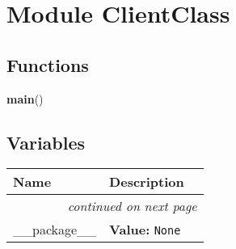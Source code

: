 %
%
%


\section{Module ClientClass}

    \label{ClientClass}


  \subsection{Functions}

    \label{ClientClass:main}

    \vspace{0.5ex}

\hspace{.8\funcindent}\begin{boxedminipage}{\funcwidth}

    \raggedright \textbf{main}()

\setlength{\parskip}{2ex}
\setlength{\parskip}{1ex}
    \end{boxedminipage}



  \subsection{Variables}

    \vspace{-1cm}
\hspace{\varindent}\begin{longtable}{|p{\varnamewidth}|p{\vardescrwidth}|l}
\cline{1-2}
\cline{1-2} \centering \textbf{Name} & \centering \textbf{Description}& \\
\cline{1-2}
\endhead\cline{1-2}\multicolumn{3}{r}{\small\textit{continued on next page}}\\\endfoot\cline{1-2}
\endlastfoot\raggedright \_\-\_\-p\-a\-c\-k\-a\-g\-e\-\_\-\_\- & \raggedright \textbf{Value:} 
{\tt None}&\\
\cline{1-2}
\end{longtable}


